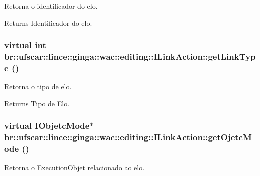 Retorna o identificador do elo. 

\begin{DoxyReturn}{Returns}
Identificador do elo. 
\end{DoxyReturn}
\hypertarget{classbr_1_1ufscar_1_1lince_1_1ginga_1_1wac_1_1editing_1_1ILinkAction_abf2d8eaacc9fc1d87df7a06edbbc8a93}{
\subsubsection[{getLinkType}]{\setlength{\rightskip}{0pt plus 5cm}virtual int br::ufscar::lince::ginga::wac::editing::ILinkAction::getLinkType ()}}
\label{classbr_1_1ufscar_1_1lince_1_1ginga_1_1wac_1_1editing_1_1ILinkAction_abf2d8eaacc9fc1d87df7a06edbbc8a93}


Retorna o tipo de elo. 

\begin{DoxyReturn}{Returns}
Tipo de Elo. 
\end{DoxyReturn}
\hypertarget{classbr_1_1ufscar_1_1lince_1_1ginga_1_1wac_1_1editing_1_1ILinkAction_ab0cd7d6ceaae080691a387a213eb30b0}{
\subsubsection[{getOjetcMode}]{\setlength{\rightskip}{0pt plus 5cm}virtual IObjetcMode$\ast$ br::ufscar::lince::ginga::wac::editing::ILinkAction::getOjetcMode ()}}
\label{classbr_1_1ufscar_1_1lince_1_1ginga_1_1wac_1_1editing_1_1ILinkAction_ab0cd7d6ceaae080691a387a213eb30b0}


Retorna o ExecutionObjet relacionado ao elo. 


